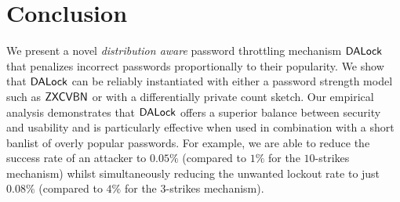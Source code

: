 

\section{Conclusion}
We present a novel {\em distribution aware} password throttling mechanism $\mathsf{DALock}$ that penalizes incorrect passwords proportionally to their popularity. We show that $\mathsf{DALock}$ can be reliably instantiated with either a password strength model such as $\mathsf{ZXCVBN}$ or with a differentially private count sketch. Our empirical analysis demonstrates that $\mathsf{DALock}$ offers a superior balance between security and usability and is particularly effective when used in combination with a short banlist of overly popular passwords. For example, we are able to  reduce the success rate of an attacker to $0.05\%$ (compared to $1\%$ for the $10$-strikes mechanism) whilst simultaneously reducing the unwanted lockout rate to just $0.08\%$ (compared to $4\%$ for the $3$-strikes mechanism).  
